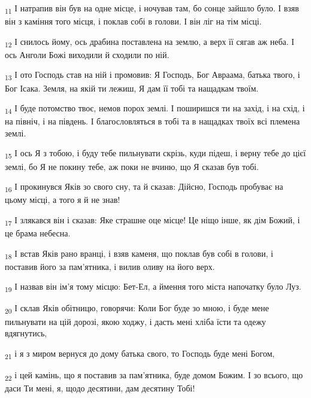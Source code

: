 \begin{tcolorbox}
\textsubscript{11} І натрапив він був на одне місце, і ночував там, бо сонце зайшло було. І взяв він з каміння того місця, і поклав собі в голови. І він ліг на тім місці.
\end{tcolorbox}
\begin{tcolorbox}
\textsubscript{12} І снилось йому, ось драбина поставлена на землю, а верх її сягав аж неба. І ось Анголи Божі виходили й сходили по ній.
\end{tcolorbox}
\begin{tcolorbox}
\textsubscript{13} І ото Господь став на ній і промовив: Я Господь, Бог Авраама, батька твого, і Бог Ісака. Земля, на якій ти лежиш, Я дам її тобі та нащадкам твоїм.
\end{tcolorbox}
\begin{tcolorbox}
\textsubscript{14} І буде потомство твоє, немов порох землі. І поширишся ти на захід, і на схід, і на північ, і на південь. І благословляться в тобі та в нащадках твоїх всі племена землі.
\end{tcolorbox}
\begin{tcolorbox}
\textsubscript{15} І ось Я з тобою, і буду тебе пильнувати скрізь, куди підеш, і верну тебе до цієї землі, бо Я не покину тебе, аж поки не вчиню, що Я сказав був тобі.
\end{tcolorbox}
\begin{tcolorbox}
\textsubscript{16} І прокинувся Яків зо свого сну, та й сказав: Дійсно, Господь пробуває на цьому місці, а того я й не знав!
\end{tcolorbox}
\begin{tcolorbox}
\textsubscript{17} І злякався він і сказав: Яке страшне оце місце! Це ніщо інше, як дім Божий, і це брама небесна.
\end{tcolorbox}
\begin{tcolorbox}
\textsubscript{18} І встав Яків рано вранці, і взяв каменя, що поклав був собі в голови, і поставив його за пам'ятника, і вилив оливу на його верх.
\end{tcolorbox}
\begin{tcolorbox}
\textsubscript{19} І назвав він ім'я тому місцю: Бет-Ел, а ймення того міста напочатку було Луз.
\end{tcolorbox}
\begin{tcolorbox}
\textsubscript{20} І склав Яків обітницю, говорячи: Коли Бог буде зо мною, і буде мене пильнувати на цій дорозі, якою ходжу, і дасть мені хліба їсти та одежу вдягнутись,
\end{tcolorbox}
\begin{tcolorbox}
\textsubscript{21} і я з миром вернуся до дому батька свого, то Господь буде мені Богом,
\end{tcolorbox}
\begin{tcolorbox}
\textsubscript{22} і цей камінь, що я поставив за пам'ятника, буде домом Божим. І зо всього, що даси Ти мені, я, щодо десятини, дам десятину Тобі!
\end{tcolorbox}
